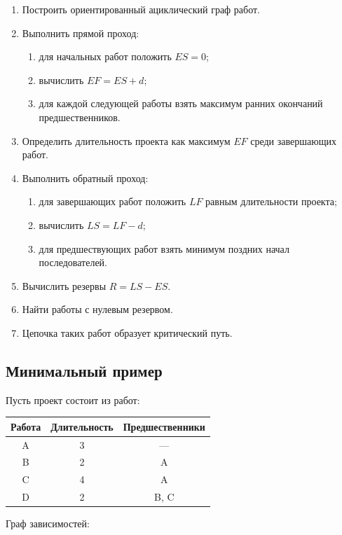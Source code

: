 \documentclass[12pt,a4paper]{article}
\begin{document}
\begin{enumerate}
    \item Построить ориентированный ациклический граф работ.
    \item Выполнить прямой проход:
    \begin{enumerate}
        \item для начальных работ положить $ES=0$;
        \item вычислить $EF=ES+d$;
        \item для каждой следующей работы взять максимум ранних окончаний предшественников.
    \end{enumerate}
    \item Определить длительность проекта как максимум $EF$ среди завершающих работ.
    \item Выполнить обратный проход:
    \begin{enumerate}
        \item для завершающих работ положить $LF$ равным длительности проекта;
        \item вычислить $LS=LF-d$;
        \item для предшествующих работ взять минимум поздних начал последователей.
    \end{enumerate}
    \item Вычислить резервы $R=LS-ES$.
    \item Найти работы с нулевым резервом.
    \item Цепочка таких работ образует критический путь.
\end{enumerate}

\subsection{Минимальный пример}

Пусть проект состоит из работ:

\begin{center}
\begin{tabular}{|c|c|c|}
\hline
Работа & Длительность & Предшественники \\
\hline
A & 3 & --- \\
\hline
B & 2 & A \\
\hline
C & 4 & A \\
\hline
D & 2 & B, C \\
\hline
\end{tabular}
\end{center}

Граф зависимостей:
\end{document}
